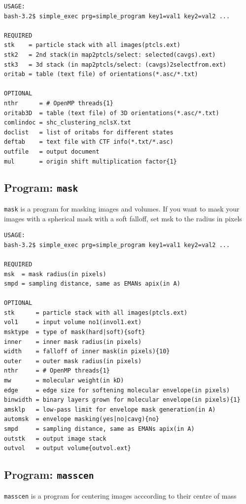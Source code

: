 \documentclass[a4paper,11pt]{article}
\newcommand{\prgname}[1]{\textcolor{NavyBlue}{\texttt{#1}}}
\begin{document}
\begin{verbatim}
USAGE:
bash-3.2$ simple_exec prg=simple_program key1=val1 key2=val2 ...

REQUIRED
stk    = particle stack with all images(ptcls.ext)
stk2   = 2nd stack(in map2ptcls/select: selected(cavgs).ext)
stk3   = 3d stack (in map2ptcls/select: (cavgs)2selectfrom.ext)
oritab = table (text file) of orientations(*.asc/*.txt)

OPTIONAL
nthr      = # OpenMP threads{1}
oritab3D  = table (text file) of 3D orientations(*.asc/*.txt)
comlindoc = shc_clustering_nclsX.txt
doclist   = list of oritabs for different states
deftab    = text file with CTF info(*.txt/*.asc)
outfile   = output document
mul       = origin shift multiplication factor{1}
\end{verbatim}

\subsection{Program: \prgname{mask}}
\label{mask}
\prgname{mask} is a program for masking images and volumes. If you want to mask your images with a spherical mask with a soft falloff, set msk to the radius in pixels

\begin{verbatim}
USAGE:
bash-3.2$ simple_exec prg=simple_program key1=val1 key2=val2 ...

REQUIRED
msk  = mask radius(in pixels)
smpd = sampling distance, same as EMANs apix(in A)

OPTIONAL
stk      = particle stack with all images(ptcls.ext)
vol1     = input volume no1(invol1.ext)
msktype  = type of mask(hard|soft){soft}
inner    = inner mask radius(in pixels)
width    = falloff of inner mask(in pixels){10}
outer    = outer mask radius(in pixels)
nthr     = # OpenMP threads{1}
mw       = molecular weight(in kD)
edge     = edge size for softening molecular envelope(in pixels)
binwidth = binary layers grown for molecular envelope(in pixels){1}
amsklp   = low-pass limit for envelope mask generation(in A)
automsk  = envelope masking(yes|no|cavg){no}
smpd     = sampling distance, same as EMANs apix(in A)
outstk   = output image stack
outvol   = output volume{outvol.ext}
\end{verbatim}

\subsection{Program: \prgname{masscen}}
\label{masscen}
\prgname{masscen} is a program for centering images acccording to their centre of mass
\end{document}
